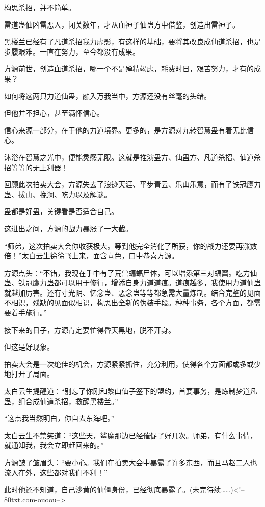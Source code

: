 \begin{this_body}
构思杀招，并不简单。

雷道蛊仙凶雷恶人，闭关数年，才从血神子仙蛊方中借鉴，创造出雷神子。

黑楼兰已经有了凡道杀招我力虚影，有这样的基础，要将其改良成仙道杀招，也是步履艰难。一直在努力，至今都没有成果。

方源前世，创造血道杀招，哪一个不是殚精竭虑，耗费时日，艰苦努力，才有的成果？

如何将这两只力道仙蛊，融入万我当中，方源还没有丝毫的头绪。

但他并不担心，甚至满怀信心。

信心来源一部分，在于他的力道境界。更多的，是方源对九转智慧蛊有着无比信心。

沐浴在智慧之光中，便能灵感无限。这就是推演蛊方、仙蛊方、凡道杀招、仙道杀招等等的无上利器！

回顾此次拍卖大会，方源失去了浪迹天涯、平步青云、乐山乐意，而有了铁冠鹰力蛊、拔山、挽澜、吃力以及解谜。

蛊都是好蛊，关键看是否适合自己。

这进出之间，方源的战力暴涨了一大截。

“师弟，这次拍卖大会你收获极大。等到他完全消化了所获，你的战力还要再涨数倍！”太白云生徐徐飞上来，面含喜色，口中恭喜方源。

方源点头：“不错，我现在手中有了荒兽蝙蝠尸体，可以增添第三对蝠翼。吃力仙蛊、铁冠鹰力蛊都可以用于修行，增添自身力道道痕。道痕越多，我使用力道仙蛊就越加厉害。还有寸光阴、忆念蛊、恶念蛊等等都急需大量炼制。结合完整的见面不相识，残缺的见面似相识，构思出全新的伪装手段。种种事务，各个方面，都需要着手施行。”

接下来的日子，方源肯定要忙得昏天黑地，脱不开身。

但这是好现象。

拍卖大会是一次绝佳的机会，方源紧紧抓住，充分利用，使得各个方面都或多或少地打开了局面。

太白云生提醒道：“别忘了你刚和黎山仙子签下的盟约，首要事务，是炼制梦道凡蛊，组合成仙道杀招，救醒黑楼兰。”

“这点我当然明白，你自去东海吧。”

太白云生不禁笑道：“这些天，鲨魔那边已经催促了好几次。师弟，有什么事情，就通知我，我会立即赶回来的。”

方源皱了皱眉头：“要小心。我们在拍卖大会中暴露了许多东西，而且马赵二人也流入在外，这些都对我们不利！”

此时他还不知道，自己沙黄的仙僵身份，已经彻底暴露了。(未完待续……)<!--80txt.com-ouoou-->

\end{this_body}

